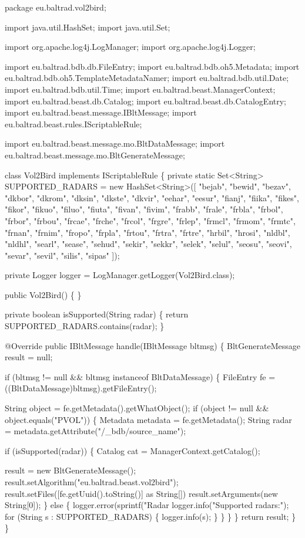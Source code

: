 \begin{DoxyCode}
package eu.baltrad.vol2bird;

import java.util.HashSet;
import java.util.Set;

import org.apache.log4j.LogManager;
import org.apache.log4j.Logger;

import eu.baltrad.bdb.db.FileEntry;
import eu.baltrad.bdb.oh5.Metadata;
import eu.baltrad.bdb.oh5.TemplateMetadataNamer;
import eu.baltrad.bdb.util.Date;
import eu.baltrad.bdb.util.Time;
import eu.baltrad.beast.ManagerContext;
import eu.baltrad.beast.db.Catalog;
import eu.baltrad.beast.db.CatalogEntry;
import eu.baltrad.beast.message.IBltMessage;
import eu.baltrad.beast.rules.IScriptableRule;

import eu.baltrad.beast.message.mo.BltDataMessage;
import eu.baltrad.beast.message.mo.BltGenerateMessage;

class Vol2Bird implements IScriptableRule \{
  private static Set<String> SUPPORTED\_RADARS = new HashSet<String>([
    "bejab", "bewid", "bezav", "dkbor", "dkrom",
    "dksin", "dkste", "dkvir", "eehar", "eesur",
    "fianj", "fiika", "fikes", "fikor", "fikuo",
    "filuo", "fiuta", "fivan", "fivim", "frabb",
    "frale", "frbla", "frbol", "frbor", "frbou",
    "frcae", "frche", "frcol", "frgre", "frlep",
    "frmcl", "frmom", "frmtc", "frnan", "frnim",
    "fropo", "frpla", "frtou", "frtra", "frtre",
    "hrbil", "hrosi", "nldbl", "nldhl", "searl",
    "sease", "sehud", "sekir", "sekkr", "selek",
    "selul", "seosu", "seovi", "sevar", "sevil",
    "silis", "sipas"
  ]);

  private Logger logger = LogManager.getLogger(Vol2Bird.class);

  public Vol2Bird() \{
  \}

  private boolean isSupported(String radar) \{
    return SUPPORTED\_RADARS.contains(radar);
  \}

  @Override
  public IBltMessage handle(IBltMessage bltmsg) \{
    BltGenerateMessage result = null;

    if (bltmsg != null && bltmsg instanceof BltDataMessage) \{
      FileEntry fe = ((BltDataMessage)bltmsg).getFileEntry();

      String object = fe.getMetadata().getWhatObject();
      if (object != null && object.equals("PVOL")) \{
        Metadata metadata = fe.getMetadata();
        String radar = metadata.getAttribute("/\_bdb/source\_name");

        if (isSupported(radar)) \{
          Catalog cat = ManagerContext.getCatalog();

          result = new BltGenerateMessage();
          result.setAlgorithm("eu.baltrad.beast.vol2bird");
          result.setFiles([fe.getUuid().toString()] as String[])
          result.setArguments(new String[0]);
        \}
        else \{
          logger.error(sprintf("Radar %
          logger.info("Supported radars:");
          for (String s : SUPPORTED\_RADARS) \{
            logger.info(s);
          \}
        \}
      \}
    \}
    return result;
  \}
\}
\end{DoxyCode}
 